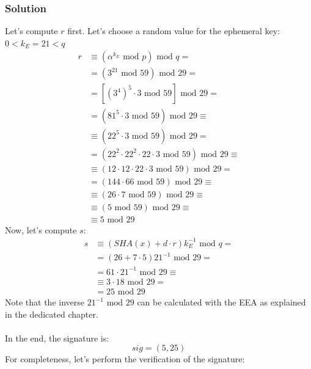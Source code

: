 \documentclass[11pt, a4paper]{article}
\newcommand{\mymod}{
    \text{ mod }
}
\begin{document}
\subsubsection*{Solution}
Let's compute $r$ first. Let's choose a random value for the ephemeral key: $0<k_E=21<q$
\begin{align*}
    r&\equiv(\alpha^{k_E}\mymod p)\mymod q=\\
    &=(3^{21}\mymod59)\mymod29=\\
    &=\left[(3^4)^5\cdot3\mymod59\right]\mymod29=\\
    &=\left(81^5\cdot3\mymod59\right)\mymod29\equiv\\
    &\equiv\left(22^5\cdot3\mymod59\right)\mymod29=\\
    &=\left(22^2\cdot22^2\cdot22\cdot3\mymod59\right)\mymod29\equiv\\
    &\equiv(12\cdot12\cdot22\cdot3\mymod59)\mymod29=\\
    &=(144\cdot66\mymod59)\mymod29\equiv\\
    &\equiv(26\cdot7\mymod59)\mymod29\equiv\\
    &\equiv(5\mymod59)\mymod29\equiv\\
    &\equiv5\mymod29
\end{align*}
Now, let's compute $s$:
\begin{align*}
    s&\equiv(SHA(x)+d\cdot r)k_E^{-1}\mymod q=\\
    &=(26+7\cdot5)21^{-1}\mymod29=\\
    &=61\cdot21^{-1}\mymod29\equiv\\
    &\equiv3\cdot18\mymod29=\\
    &=25\mymod29
\end{align*}
Note that the inverse $21^{-1}\mymod29$ can be calculated with the EEA as explained in the dedicated chapter.\\\\
In the end, the signature is:
$$sig=(5,25)$$
For completeness, let's perform the verification of the signature:
\end{document}
